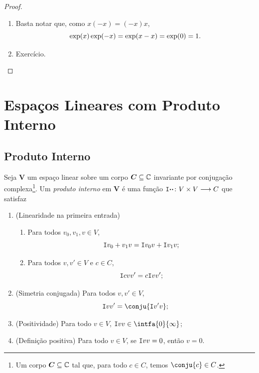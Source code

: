 \begin{proof}
\begin{enumerate}
	\item Basta notar que, como $x(-x)=(-x)x$,
		\begin{equation*}
		\exp(x)\exp(-x) = \exp(x-x) = \exp(0) = 1. \qedhere
		\end{equation*}
	
	\item Exercício.
	\end{enumerate}
\end{proof}







\chapter{Espaços Lineares com Produto Interno}

\section{Produto Interno}

\begin{defi}
Seja $\bm V$ um espaço linear sobre um corpo $\bm C \subseteq \mathbb{C}$ invariante por conjugação complexa\footnote{Um corpo $\bm C \subseteq \mathbb{C}$ tal que, para todo $c \in C$, temos $\conju{c} \in C$.}. Um \emph{produto interno} em $\bm V$ é uma função $\mathtt I{\bm{\cdot}}{\bm{\cdot}}\colon V \times V \longrightarrow C$ que satisfaz
	\begin{enumerate}
	\item (Linearidade na primeira entrada)
		\begin{enumerate}
		\item Para todos $v_0,v_1,v \in V$,
			\begin{equation*}
			\mathtt I{v_0+v_1}{v} = \mathtt I{v_0}{v} + \mathtt I{v_1}{v};
			\end{equation*}
		\item Para todos $v,v' \in V$ e $c \in C$,
			\begin{equation*}
			\mathtt I{cv}{v'} = c\mathtt I{v}{v'};
			\end{equation*}
		\end{enumerate}
	\item (Simetria conjugada) Para todos $v,v' \in V$,
		\begin{equation*}
		\inte{v}{v'} = \conju{\inte{v'}{v}};
		\end{equation*}
	\item (Positividade) Para todo $v \in V$, $\inte{v}{v} \in \intfa{0}{\infty}$;
	\item (Definição positiva) Para todo $v \in V$, se $\mathtt I{v}{v}=0$, então $v=0$.
		\end{enumerate}
\end{defi}

